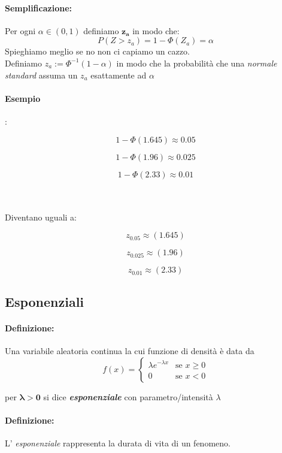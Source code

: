 \documentclass[]{article}
\newcommand{\definizione}{\paragraph{Definizione:}}
\begin{document}
    \paragraph{Semplificazione:} Per ogni $\alpha \in (0,1)$ definiamo $\boldsymbol{z_a}$ in modo che:
    \[ P(Z > z_a) = 1 - \Phi(Z_a) = \alpha \] 
    Spieghiamo meglio se no non ci capiamo un cazzo. \\
    Definiamo $z_a := \Phi^{-1}(1 - \alpha)$ in modo che la probabilità che una \textit{normale standard} assuma un $z_a$ esattamente ad $\alpha$

    \paragraph{Esempio}: \\
    \begin{minipage}{0.3\textwidth}
        \[ 1 - \Phi(1.645) \approx 0.05 \]
    \end{minipage}
    \begin{minipage}{0.3\textwidth}
        \[ 1 - \Phi(1.96) \approx 0.025 \]
    \end{minipage}
    \begin{minipage}{0.3\textwidth}
        \[ 1 - \Phi(2.33) \approx 0.01 \]
    \end{minipage} \\ \\
    Diventano uguali a: \\
    \begin{minipage}{0.3\textwidth}
        \[ z_{0.05} \approx (1.645) \]
    \end{minipage}
    \begin{minipage}{0.3\textwidth}
        \[ z_{0.025} \approx (1.96) \]
    \end{minipage}
    \begin{minipage}{0.3\textwidth}
        \[ z_{0.01} \approx (2.33) \]
    \end{minipage}

    \newpage
    \subsection{Esponenziali}
    \definizione Una variabile aleatoria continua la cui funzione di densità è data da 
    \begin{equation*}
        f(x) =
        \begin{cases}
            \lambda e^{-\lambda x} & \text{se } x \geq 0 \\
            0 & \text{se } x < 0
        \end{cases}
    \end{equation*}
    \centerline{per $\boldsymbol{\lambda > 0}$ si dice \textbf{\textit{esponenziale}} con parametro/intensità $\lambda$}
    \definizione L' \textit{esponenziale} rappresenta la durata di vita di un fenomeno.
\end{document}
